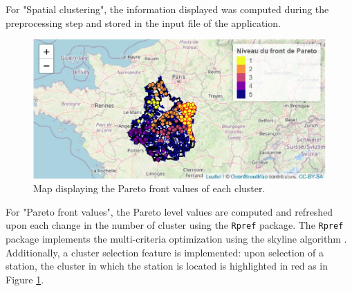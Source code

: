 For "Spatial clustering", the information displayed was computed during the preprocessing step and stored in the input file of the application.   

\begin{figure}[htbp]
  \centering
  \includegraphics[]{figs/Chap6/Im_appbis7.pdf}
  \caption{Map displaying the Pareto front values of each cluster.}
  \label{fig:Imapp7}
\end{figure}

For "Pareto front values", the Pareto level values are computed and refreshed upon each change in the number of cluster using the \texttt{Rpref} package. The \texttt{Rpref} package implements the multi-criteria optimization using the skyline algorithm \citep{914855}. Additionally, a cluster selection feature is implemented: upon selection of a station, the cluster in which the station is located is highlighted in red as in Figure \ref{fig:Imapp7}. 



